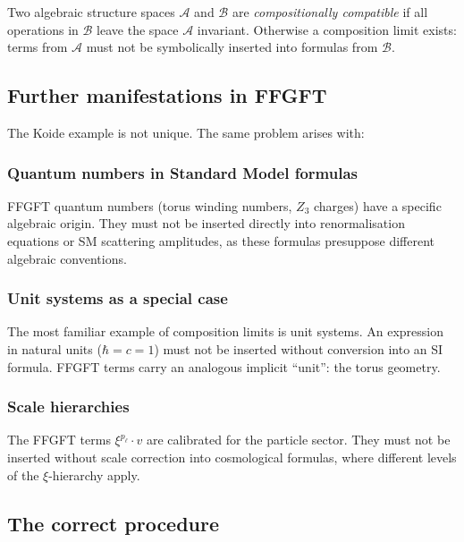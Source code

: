 \begin{foundation}
Two algebraic structure spaces $\mathcal{A}$ and $\mathcal{B}$ are
\emph{compositionally compatible} if all operations in $\mathcal{B}$
leave the space $\mathcal{A}$ invariant. Otherwise a composition limit
exists: terms from $\mathcal{A}$ must not be symbolically inserted
into formulas from $\mathcal{B}$.
\end{foundation}

\subsection{Further manifestations in FFGFT}

The Koide example is not unique. The same problem arises with:

\subsubsection*{Quantum numbers in Standard Model formulas}

FFGFT quantum numbers (torus winding numbers, $Z_3$ charges) have a
specific algebraic origin. They must not be inserted directly into
renormalisation equations or SM scattering amplitudes, as these formulas
presuppose different algebraic conventions.

\subsubsection*{Unit systems as a special case}

The most familiar example of composition limits is unit systems.
An expression in natural units ($\hbar = c = 1$) must not be inserted
without conversion into an SI formula. FFGFT terms carry an analogous
implicit ``unit'': the torus geometry.

\subsubsection*{Scale hierarchies}

The FFGFT terms $\xi^{p_\ell} \cdot v$ are calibrated for the particle sector.
They must not be inserted without scale correction into cosmological formulas,
where different levels of the $\xi$-hierarchy apply.

\subsection{The correct procedure}

